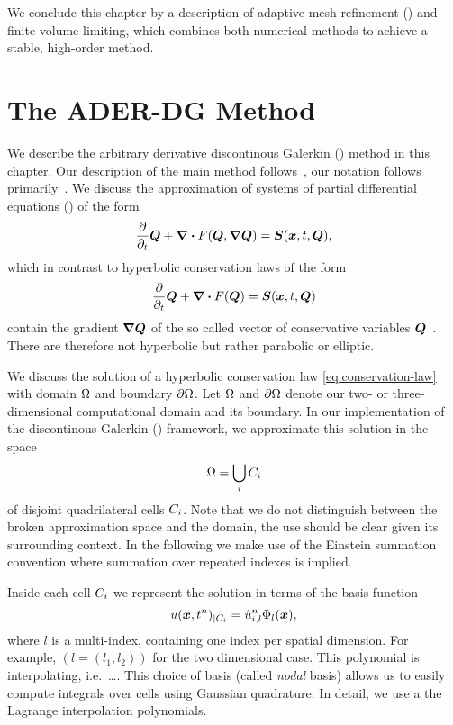 We conclude this chapter by a description of adaptive mesh refinement (\amr) and finite volume limiting, which combines both numerical methods to achieve a stable, high-order method.

\section{The ADER-DG Method}\label{sec:ader-dg}
We describe the arbitrary derivative discontinous Galerkin (\aderdg) method in this chapter.
Our description of the main method follows~\cite{dumbser2008unified,dumbser2010arbitrary,dumbser2018efficient}, our notation follows primarily~\cite{dumbser2018efficient}.
We discuss the approximation of systems of partial differential equations (\pde) of the form
\begin{equation}
  \label{eq:conservation-law-gradient}
 \frac{\partial}{\partial_t}  \Q + \div \flux(\Q, \gradQ) = \source(\bm{x}, t, \Q),
\end{equation}
which in contrast to hyperbolic conservation laws of the form
\begin{equation}
  \label{eq:conservation-law}
 \frac{\partial}{\partial_t}  \Q + \div \flux(\Q) = \source(\bm{x}, t, \Q)
\end{equation}
contain the gradient $\gradQ$ of the so called vector of conservative variables $\bm{Q}$~\cite{dumbser2010arbitrary}.
There are therefore not hyperbolic but rather parabolic or elliptic.

We discuss the solution of a hyperbolic conservation law \cref{eq:conservation-law} with domain $\Omega$ and boundary $\partial \Omega$.
Let $\Omega$ and $\partial \Omega$ denote our two- or three-dimensional computational domain and its boundary.
In our implementation of the discontinous Galerkin (\dg) framework, we approximate this solution in the space
\begin{equation}
  \label{eq:dg-space}
  \broken = \bigcup_i \cell
\end{equation}
of disjoint quadrilateral cells $C_{i}$.
Note that we do not distinguish between the broken approximation space and the domain, the use should be clear given its surrounding context.
In the following we make use of the Einstein summation convention where summation over repeated indexes is implied.

Inside each cell $C_{i}$ we represent the solution in terms of the basis function 
\begin{equation}
  \label{eq:cell-approx}
  u(\bm{x}, t^n)_{|\cell[i]} = \hat{u}^n_{i,l} \sbasis{l}(\bm{x}),
\end{equation}
where $l$ is a multi-index, containing one index per spatial dimension.
For example, $(l = (l_1, l_2))$ for the two dimensional case.
This polynomial is interpolating, i.e.\ \ldots{}.
This choice of basis (called \textit{nodal} basis) allows us to easily compute integrals over cells using Gaussian quadrature.
In detail, we use a the Lagrange interpolation polynomials.

